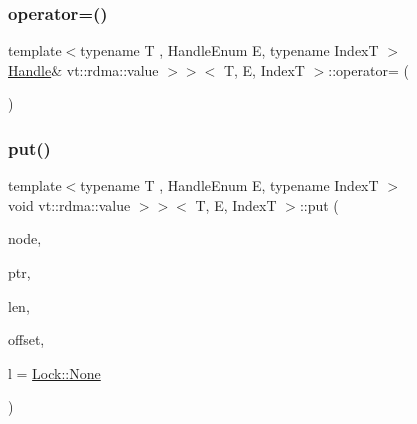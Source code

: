 \subsubsection{\texorpdfstring{operator=()}{operator=()}\hspace{0.1cm}{\footnotesize\ttfamily [2/2]}}
{\footnotesize\ttfamily template$<$typename T , Handle\+Enum E, typename IndexT $>$ \\
\hyperlink{structvt_1_1rdma_1_1_handle}{Handle}\& vt\+::rdma\+::value $>$$>$$<$ T, E, IndexT $>$\+::operator= (\begin{DoxyParamCaption}\item[{\hyperlink{structvt_1_1rdma_1_1_handle}{Handle}$<$ T, E, IndexT, typename std\+::enable\+\_\+if\+\_\+t$<$ std\+::is\+\_\+same$<$ IndexT, \hyperlink{namespacevt_a866da9d0efc19c0a1ce79e9e492f47e2}{vt\+::\+Node\+Type} $>$\+::value $>$$>$ \&\&}]{ }\end{DoxyParamCaption})\hspace{0.3cm}{\ttfamily [default]}}

\mbox{\label{structvt_1_1rdma_1_1_handle_3_01_t_00_01_e_00_01_index_t_00_01typename_01std_1_1enable__if__t_3_d15dac1b5db6e2bc0fb0b8aca42b1456_a320194a1c7de498bcb788854eb5617b5}} 
\subsubsection{\texorpdfstring{put()}{put()}}
{\footnotesize\ttfamily template$<$typename T , Handle\+Enum E, typename IndexT $>$ \\
void vt\+::rdma\+::value $>$$>$$<$ T, E, IndexT $>$\+::put (\begin{DoxyParamCaption}\item[{\hyperlink{namespacevt_a866da9d0efc19c0a1ce79e9e492f47e2}{vt\+::\+Node\+Type}}]{node,  }\item[{T $\ast$}]{ptr,  }\item[{std\+::size\+\_\+t}]{len,  }\item[{int}]{offset,  }\item[{\hyperlink{namespacevt_1_1rdma_ac5c20b41a653e520b6305d4d454ecb70}{Lock}}]{l = {\ttfamily \hyperlink{namespacevt_1_1rdma_ac5c20b41a653e520b6305d4d454ecb70a6adf97f83acf6453d4a6a4b1070f3754}{Lock\+::\+None}} }\end{DoxyParamCaption})}



